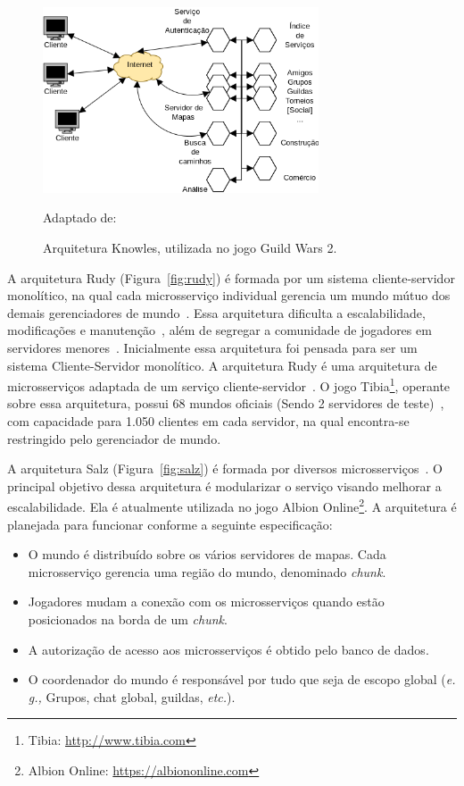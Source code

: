 \begin{figure}[htb!]
  \caption{Arquitetura Knowles, utilizada no jogo Guild Wars 2.}
  \label{fig:knowles}
  \includegraphics[height=5.5cm]{arquiteturas/knowles.png}
  \centering

  Adaptado de:~\cite{stephenclarkewillson2017}
\end{figure}

A arquitetura Rudy (Figura~\ref{fig:rudy}) é formada por um sistema cliente-servidor monolítico, na qual cada microsserviço individual gerencia um mundo mútuo dos demais gerenciadores de mundo~\cite{matthiasrudy2011}.
%
Essa arquitetura dificulta a escalabilidade, modificações e manutenção~\cite{8169955}, além de segregar a comunidade de jogadores em servidores menores~\cite{matthiasrudy2011}.
%
Inicialmente essa arquitetura foi pensada para ser um sistema Cliente-Servidor monolítico.
%
A arquitetura Rudy é uma arquitetura de microsserviços adaptada de um serviço cliente-servidor~\cite{matthiasrudy2011}.
%
O jogo Tibia\footnote[1]{Tibia: \url{http://www.tibia.com}}, operante sobre essa arquitetura, possui 68 mundos oficiais (Sendo 2 servidores de teste)~\cite{matthiasrudy2011}, com capacidade para 1.050 clientes em cada servidor, na qual encontra-se restringido pelo gerenciador de mundo.



A arquitetura Salz (Figura~\ref{fig:salz}) é formada por diversos microsserviços~\cite{albion_online_unite}.
%
O principal objetivo dessa arquitetura é modularizar o serviço visando melhorar a escalabilidade.
%
Ela é atualmente utilizada no jogo Albion Online\footnote[2]{Albion Online: \url{https://albiononline.com}}.
%
A arquitetura é planejada para funcionar conforme a seguinte especificação\cite{albion_online_unite}:

\begin{itemize}
  \item O mundo é distribuído sobre os vários servidores de mapas. Cada microsserviço gerencia uma região do mundo, denominado \textit{chunk}.
  \item Jogadores mudam a conexão com os microsserviços quando estão posicionados na borda de um \textit{chunk}.
  \item A autorização de acesso aos microsserviços é obtido pelo banco de dados.
  \item O coordenador do mundo é responsável por tudo que seja de escopo global (\textit{e. g.,} Grupos, chat global, guildas, \textit{etc.}).
\end{itemize}

